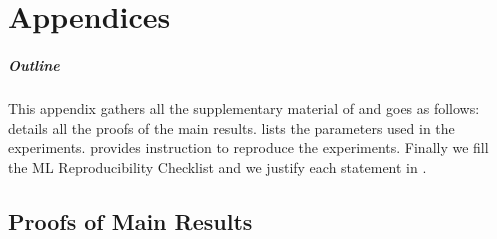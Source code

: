 \chapter{Appendices}
\label{chap:appendix}
\appendix

\paragraph{Outline}

This appendix gathers all the supplementary material of  and goes as follows:  details all the proofs of the main results.  lists the parameters used in the experiments.  provides instruction to reproduce the experiments. Finally we fill the \acrlong{ML} Reproducibility Checklist and we justify each statement in .


\section{Proofs of Main Results}
\label{sec:proofs}

\subsection{}
\label{proof-bellman-expectation}

